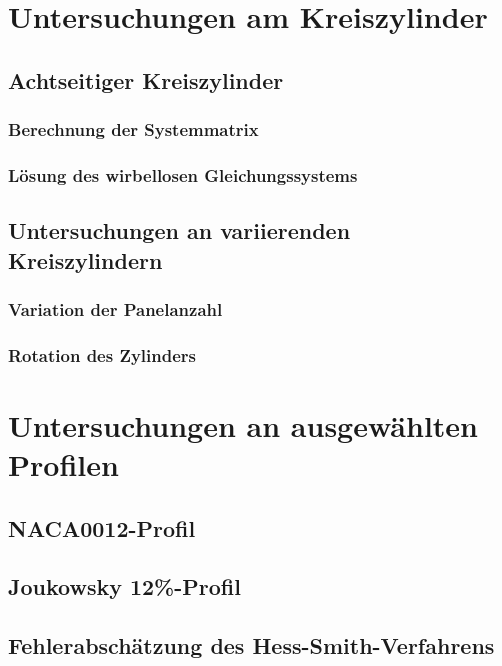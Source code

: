 \section{Untersuchungen am  Kreiszylinder}
\subsection{Achtseitiger Kreiszylinder}
\subsubsection{Berechnung der Systemmatrix}
\subsubsection{Lösung des wirbellosen Gleichungssystems}
\subsection{Untersuchungen an variierenden Kreiszylindern}
\subsubsection{Variation der Panelanzahl}
\subsubsection{Rotation des Zylinders}
\section{Untersuchungen an ausgewählten Profilen}
\subsection{NACA0012-Profil}
\subsection{Joukowsky 12\%-Profil}
\subsection{Fehlerabschätzung des Hess-Smith-Verfahrens}




\newpage